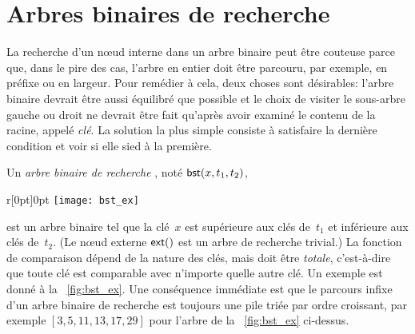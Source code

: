 \chapter{Arbres binaires de recherche}

La recherche d'un n{\oe}ud interne dans un arbre binaire peut être
couteuse parce que, dans le pire des cas, l'arbre en entier doit être
parcouru, par exemple, en préfixe ou en largeur. Pour remédier à cela,
deux choses sont désirables: l'arbre binaire devrait être aussi
équilibré que possible et le
choix de visiter le sous-arbre gauche ou droit ne devrait être fait
qu'après avoir examiné le contenu de la racine, appelé
\emph{clé}. La solution la plus simple consiste à
satisfaire la dernière condition et voir si elle sied à la première.

Un \emph{arbre binaire de recherche} \citep{Mahmoud_1992}, noté \(\textsf{bst}(x, t_1,
t_2)\),
\begin{wrapfigure}[7]{r}[0pt]{0pt}
\centering
\texttt{[image: bst\_ex]}
\caption{\label{fig:bst_ex}}
\end{wrapfigure}
est un arbre binaire tel que la clé~\(x\) est supérieure aux clés
de~\(t_1\) et inférieure aux clés de~\(t_2\). (Le n{\oe}ud externe
\(\textsf{ext}()\) est un arbre de recherche trivial.) La fonction de
comparaison dépend de la nature des clés, mais doit être
\emph{totale}, c'est-à-dire que toute clé est comparable avec
n'importe quelle autre clé. Un exemple est donné à la
\fig~\vref{fig:bst_ex}. Une conséquence immédiate est que le parcours
infixe d'un arbre binaire de
recherche est toujours une pile triée par ordre croissant, par exemple
\([3,5,11,13,17,29]\) pour l'arbre de la \fig~\ref{fig:bst_ex}
ci-dessus.

